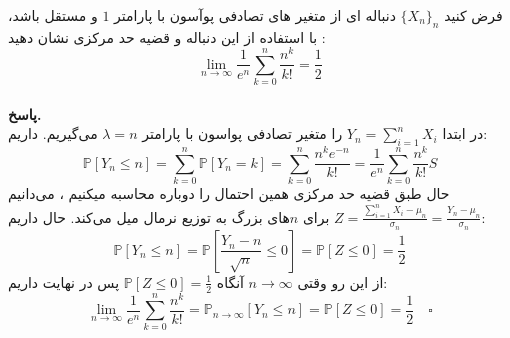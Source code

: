 \problem{}
فرض کنید $\{X_n\}_n$ دنباله ای از متغیر های تصادفی پوآسون با پارامتر $1$ و مستقل باشد، با استفاده از این دنباله و قضیه حد مرکزی نشان دهید
:\\
\[
    \lim_{n \to \infty}\dfrac{1}{e^n}\sum_{k=0}^{n} \dfrac{n^k}{k!}=\dfrac{1}{2}
\]
\\
\textbf{پاسخ.}\\


در ابتدا $Y_n=\sum_{i=1}^{n} X_i$ را متغیر تصادفی پواسون با پارامتر $\lambda = n$ می‌گیریم. داریم:
\[
	\mathbb{P}[Y_n \leq n] = \sum_{k=0}^{n} \mathbb{P}[Y_n = k] = \sum_{k=0}^{n} \frac{n^k e^{-n}}{k!} = \frac{1}{e^n}\sum_{k=0}^{n} \frac{n^k}{k!}S
\]
حال طبق قضیه حد مرکزی همین احتمال را دوباره محاسبه میکنیم ، می‌دانیم $Z=\frac{\sum_{i=1}^{n} X_i-\mu_n}{\sigma_n}=\frac{Y_n-\mu_n}{\sigma_n}$ برای $n$های بزرگ به توزیع نرمال میل می‌کند. حال داریم:
\[
	\mathbb{P}[Y_n \leq n]= \mathbb{P}[\frac{Y_n-n}{\sqrt{n}} \leq 0] = \mathbb{P}[Z \leq 0] = \frac{1}{2}
\]
از این رو وقتی $n\to \infty$ آنگاه $\mathbb{P}[Z\leq 0]=\frac{1}{2}$ پس در نهایت داریم:
\[
	\lim_{n\to \infty} \frac{1}{e^n}\sum_{k=0}^{n} \frac{n^k}{k!} = \mathbb{P}_{n\to \infty}[Y_n \leq n] = \mathbb{P}[Z\leq 0] = \frac{1}{2} \quad \square
\]
